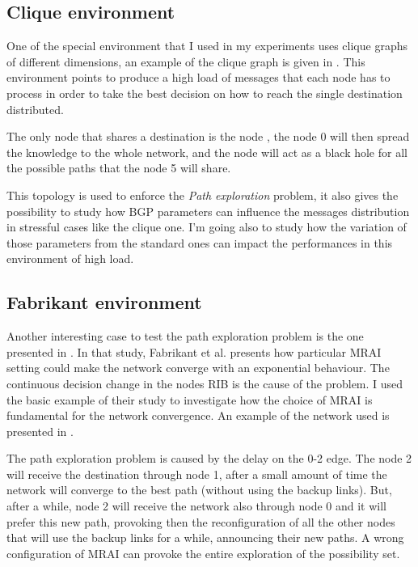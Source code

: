 \subsection{Clique environment}
\label{subsec:clique_env}

One of the special environment that I used in my experiments uses clique
graphs of different dimensions, an example of the clique graph is given in
.
This environment points to produce a high load of messages that each node has
to process in order to take the best decision on how to reach the single
destination distributed.

The only node that shares a destination is the node , the node
\num{0} will then spread the knowledge to the whole network, and the node
 will act as a black hole for all the possible paths
that the node \num{5} will share.

This topology is used to enforce the \textit{Path exploration} problem, it also
gives the possibility to study how \ac{BGP} parameters can influence the messages
distribution in stressful cases like the clique one.
I'm going also to study how the variation of those parameters from the standard
ones can impact the performances in this environment of high load.

\subsection{Fabrikant environment}
\label{subsec:fabrikant_env}

Another interesting case to test the path exploration problem is the one
presented in \cite{fabrikant2011there}.
In that study, Fabrikant et al. presents how particular \ac{MRAI} setting could
make the network converge with an exponential behaviour. The continuous decision
change in the nodes \ac{RIB} is the cause of the problem.
I used the basic example of their study to investigate how the choice of \ac{MRAI}
is fundamental for the network convergence.
An example of the network used is presented in .

The path exploration problem is caused by the delay on the \num{0}-\num{2}
edge. The node \num{2} will receive the destination through node \num{1}, after a small amount
of time the network will converge to the best path (without using the backup links).
But, after a while, node \num{2} will receive the network also through node \num{0}
and it will prefer this new path, provoking then the reconfiguration of all
the other nodes that will use the backup links for a while, announcing their
new paths.
A wrong configuration of \ac{MRAI} can provoke the entire exploration of the
possibility set.

